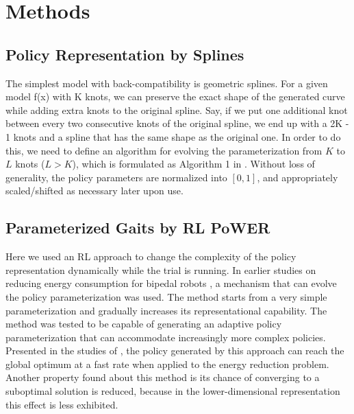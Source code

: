 \section{Methods}

\subsection{Policy Representation by Splines}
The simplest model with back-compatibility is geometric
splines.  For a given model f(x) with K knots, we can preserve the
exact shape of the generated curve while adding extra knots to the
original spline. Say, if we put one additional knot between every two
consecutive knots of the original spline, we end up with a 2K - 1
knots and a spline that has the same shape as the original one. In
order to do this, we need to define an algorithm for evolving the
parameterization from $K$ to $L$ knots ($L > K$), which is formulated as 
Algorithm 1 in \cite{kormushev2011bipedal-walking-energy} .  Without loss of generality, the policy parameters are
normalized into $[0, 1]$, and appropriately scaled/shifted as necessary
later upon use.

\subsection{Parameterized Gaits by RL PoWER}

Here we used an RL approach to change the complexity of the policy
representation dynamically while the trial is running. In
earlier studies on reducing energy
consumption for bipedal robots \citep{kormushev2011bipedal-walking-energy}, a mechanism that can
evolve the policy parameterization was used. The method starts from a
very simple parameterization and gradually increases its
representational capability. The method was tested to be capable of generating
an adaptive policy parameterization that can accommodate increasingly
more complex policies. Presented in the studies of \cite{kormushev2011bipedal-walking-energy}, the policy
generated by this approach can reach the global optimum at a fast
rate when applied to the energy reduction problem. Another property found about this method is its chance of converging to a suboptimal solution is reduced, because in the lower-dimensional representation this effect is less exhibited.


